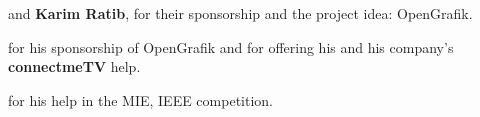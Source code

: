 \vspace{0.4cm}

\par {} and {\bf Karim Ratib}, for their sponsorship and the project idea: OpenGrafik.

\vspace{0.4cm}

\par {} for his sponsorship of OpenGrafik and for offering his and his company's {\bf connectmeTV} help.

\vspace{0.4cm}

\par {} for his help in the MIE, IEEE competition.

\vspace{0.4cm}

\par \noindent

\vspace{0.4cm}